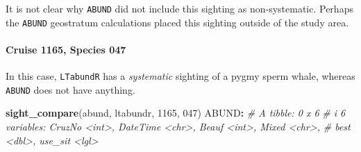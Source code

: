 \documentclass[
]{book}
\newenvironment{Shaded}{\begin{snugshade}}{\end{snugshade}}
\newcommand{\CommentTok}[1]{\textcolor[rgb]{0.56,0.35,0.01}{\textit{#1}}}
\newcommand{\DecValTok}[1]{\textcolor[rgb]{0.00,0.00,0.81}{#1}}
\newcommand{\FunctionTok}[1]{\textcolor[rgb]{0.13,0.29,0.53}{\textbf{#1}}}
\newcommand{\NormalTok}[1]{#1}
\newcommand{\SpecialCharTok}[1]{\textcolor[rgb]{0.81,0.36,0.00}{\textbf{#1}}}
\newcommand{\StringTok}[1]{\textcolor[rgb]{0.31,0.60,0.02}{#1}}
\begin{document}
It is not clear why \texttt{ABUND} did not include this sighting as non-systematic. Perhaps the \texttt{ABUND} geostratum calculations placed this sighting outside of the study area.

\hypertarget{cruise-1165-species-047}{%
\paragraph*{Cruise 1165, Species 047}\label{cruise-1165-species-047}}

In this case, \texttt{LTabundR} has a \emph{systematic} sighting of a pygmy sperm whale, whereas \texttt{ABUND} does not have anything.

\begin{Shaded}
\begin{Highlighting}[]
\FunctionTok{sight\_compare}\NormalTok{(abund, ltabundr, }\DecValTok{1165}\NormalTok{, }\StringTok{\textquotesingle{}047\textquotesingle{}}\NormalTok{)}
\NormalTok{ABUND}\SpecialCharTok{:}
\CommentTok{\# A tibble: 0 x 6}
\CommentTok{\# i 6 variables: CruzNo \textless{}int\textgreater{}, DateTime \textless{}chr\textgreater{}, Beauf \textless{}int\textgreater{}, Mixed \textless{}chr\textgreater{},}
\CommentTok{\#   best \textless{}dbl\textgreater{}, use\_sit \textless{}lgl\textgreater{}}


\end{Highlighting}
\end{Shaded}
\end{document}
